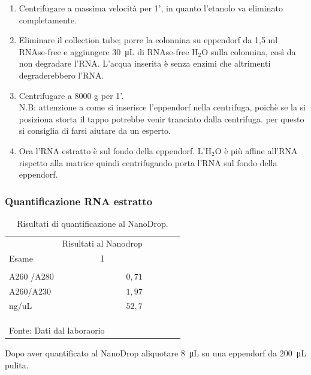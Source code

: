 \begin{enumerate}
\item Centrifugare a massima velocità per 1', in quanto l'etanolo va eliminato completamente.
\item Eliminare il collection tube; porre la colonnina su eppendorf da 1,5 ml RNAse-free e
aggiungere \SI{30}{\micro\liter} di RNAse-free H$_2$O sulla colonnina,
così da non degradare l'RNA.
L'acqua inserita è senza enzimi che altrimenti degraderebbero l'RNA.
\item Centrifugare a 8000 g per 1'.\\
N.B: attenzione a come si inserisce l'eppendorf nella centrifuga, poich\`e se la si posiziona storta
il tappo potrebbe venir tranciato dalla centrifuga. per questo si consiglia di farsi aiutare da un esperto.
\item Ora l'RNA estratto è sul fondo della eppendorf.
L'H$_2$O è pi\`u affine all'RNA rispetto alla matrice
quindi centrifugando porta l'RNA sul fondo della eppendorf.

\end{enumerate}

\subsubsection{Quantificazione RNA estratto}

\begin{table}[H]
\begin{center}

\caption{Risultati di quantificazione al NanoDrop.}
\vspace{0,3cm}
\begin{tabular}{lrrrrr}
   & \multicolumn{1}{c}{Risultati al Nanodrop} \\
   Esame & \multicolumn{1}{c}{I} \\ \hline
    & & & & & \\

  A260 /A280 & $0,71$  \\
 A260/A230 & $1,97$   \\
  ng/uL & $52,7$   \\ \\ \hline
       & & & & & \\
  & & & & &  \\ \multicolumn{6}{l}{\small Fonte: Dati dal laboraorio}
\end{tabular}

\end{center}
\end{table}
Dopo aver quantificato al NanoDrop aliquotare \SI{8}{\micro\liter} su una eppendorf da \SI{200}{\micro\liter} pulita.

